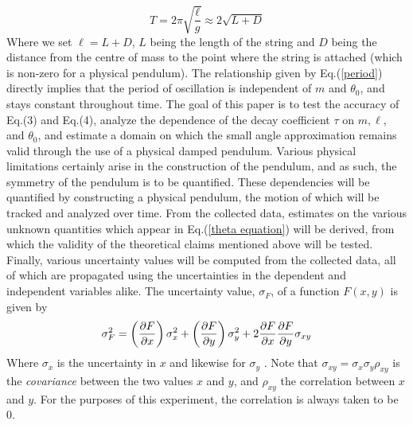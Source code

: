 \begin{equation} \label{period}
  T = 2\pi\sqrt{\frac{\ell}{g}} \approx 2\sqrt{L + D}
\end{equation}
Where we set $\ell = L + D$, $L$ being the length of the string and $D$ being the distance from the centre of mass to the point where the string is attached (which is non-zero for a physical pendulum). The relationship given by Eq.(\ref{period}) directly implies that the period of oscillation is independent of $m$ and $\theta_0$, and stays constant throughout time. The goal of this paper is to test the accuracy of Eq.(3) and Eq.(4), analyze the dependence of the decay coefficient $\tau$ on $m, \ell$, and $\theta_0$, and estimate a domain on which the small angle approximation remains valid through the use of a physical damped pendulum. Various physical limitations certainly arise in the construction of the pendulum, and as such, the symmetry of the pendulum is to be quantified. These dependencies will be quantified by constructing a physical pendulum, the motion of which will be tracked and analyzed over time. From the collected data, estimates on the various unknown quantities which appear in Eq.(\ref{theta equation}) will be derived, from which the validity of the theoretical claims mentioned above will be tested. \\[0.20cm]

Finally, various uncertainty values will be computed from the collected data, all of which are propagated using the uncertainties in the dependent and independent variables alike. The uncertainty value, $\sigma_F$, of a function $F(x, y)$ is given by
\begin{equation}\label{eq: uncertainty}
  \sigma_F^2 = \left(\frac{\partial F}{\partial x} \right)\sigma_x^2 + \left(\frac{\partial F}{\partial y} \right)\sigma_y^2 + 2\frac{\partial F}{\partial x}\frac{\partial F}{\partial y}\sigma_{xy}
\end{equation}
Where $\sigma_x$ is the uncertainty in $x$ and likewise for $\sigma_y$ \cite{uncertainty}. Note that $\sigma_{xy} = \sigma_x\sigma_y\rho_{xy}$ is the \emph{covariance} between the two values $x$ and $y$, and $\rho_{xy}$ the correlation between $x$ and $y$. For the purposes of this experiment, the correlation is always taken to be 0. \\[0.20cm]
